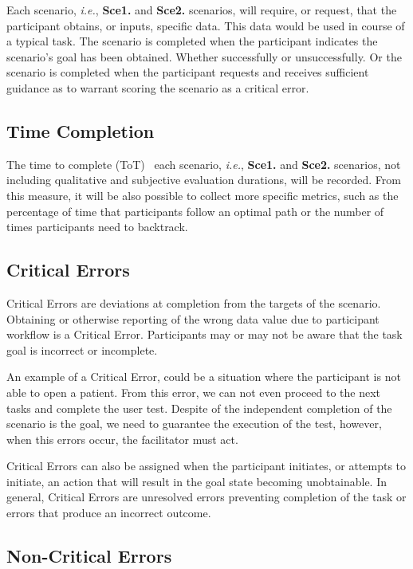Each scenario, {\it i.e.}, {\bf Sce1.} and {\bf Sce2.} scenarios, will require, or request, that the participant obtains, or inputs, specific data. This data would be used in course of a typical task. The scenario is completed when the participant indicates the scenario's goal has been obtained. Whether successfully or unsuccessfully. Or the scenario is completed when the participant requests and receives sufficient guidance as to warrant scoring the scenario as a critical error.

\subsection{Time Completion}

The time to complete (ToT)~\cite{delgado2017time, huang2018impact} each scenario, {\it i.e.}, {\bf Sce1.} and {\bf Sce2.} scenarios, not including qualitative and subjective evaluation durations, will be recorded. From this measure, it will be also possible to collect more specific metrics, such as the percentage of time that participants follow an optimal path or the number of times participants need to backtrack.

\subsection{Critical Errors}

Critical Errors are deviations at completion from the targets of the scenario. Obtaining or otherwise reporting of the wrong data value due to participant workflow is a Critical Error. Participants may or may not be aware that the task goal is incorrect or incomplete.

An example of a Critical Error, could be a situation where the participant is not able to open a patient. From this error, we can not even proceed to the next tasks and complete the user test. Despite of the independent completion of the scenario is the goal, we need to guarantee the execution of the test, however, when this errors occur, the facilitator must act.

Critical Errors can also be assigned when the participant initiates, or attempts to initiate, an action that will result in the goal state becoming unobtainable. In general, Critical Errors are unresolved errors preventing completion of the task or errors that produce an incorrect outcome.

\subsection{Non-Critical Errors}

